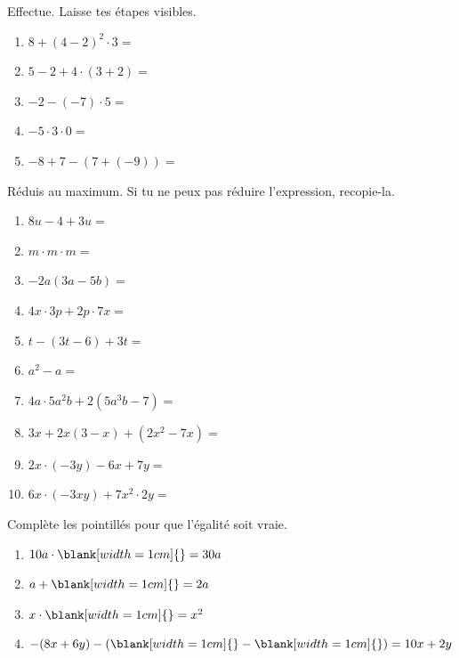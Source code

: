 \documentclass[parskip=half-,DIV=12,twoside=semi, 12pt]{scrartcl}
\newcounter{l}
\begin{document}
\begin{appliquer}[points=5]
    Effectue. Laisse tes étapes visibles.
    \begin{enumerate}[cols=2, itemsep=3cm]
        \item \(8+(4-2)^2\cdot 3=\)
        \item \(5-2+4\cdot (3+2)=\)
        \item \(-2-(-7)\cdot 5=\)
        \item \(-5\cdot 3\cdot 0=\)
        \item \(-8 + 7 -\left(7+(-9)\right)=\)
    \end{enumerate}
    \vspace*{2cm}
\end{appliquer}
\newpage
\begin{appliquer}[points=10]
    Réduis au maximum. Si tu ne peux pas réduire l'expression, recopie-la.
    \begin{enumerate}[itemsep=\fill]
        \item \(8u-4+3u=\)
        \item \(m\cdot m \cdot m =\)
        \item \(-2a(3a-5b)=\)
        \item \(4x\cdot 3p + 2p \cdot 7x=\)
        \item \(t-(3t-6) + 3t=\)
        \item \(a^2 - a=\)
        \item \(4a\cdot 5a^2b + 2(5a^3b -7)=\)
        \item \(3x + 2x(3-x) + (2x^2-7x)=\)
        \item \(2x \cdot (-3y) - 6x + 7y=\)
        \item \(6x \cdot (-3xy) + 7x^2 \cdot 2y=\)
    \end{enumerate}
    \vspace*{2cm}
\end{appliquer}
\newpage
\begin{appliquer}[points=2]
    Complète les pointillés pour que l'égalité soit vraie.
    \begin{enumerate}[cols=2]
        \item \(10a\cdot \blank[width=1cm]{} = 30a\)
        \item \(a + \blank[width=1cm]{} = 2a\)
        \item \(x \cdot \blank[width=1cm]{} = x^2\)
        \item \(-(8x+6y)- (\blank[width=1cm]{} - \blank[width=1cm]{} ) = 10x + 2y\)
    \end{enumerate}
\end{appliquer}
\end{document}
